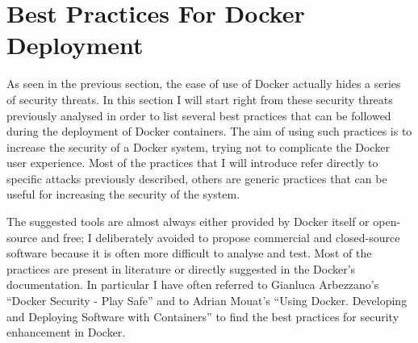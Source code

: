 \documentclass[a4paper,12pt]{article}
\begin{document}




\newpage

\section{Best Practices For Docker Deployment}
\label{sec:best_practices_for_docker_deployment}

As seen in the previous section, the ease of use of Docker actually hides a
series of security threats. In this section I will start right from these
security threats previously analysed in order to list several best practices
that can be followed during the deployment of Docker containers. The aim of
using such practices is to increase the security of a Docker system, trying not
to complicate the Docker user experience. Most of the practices that I will
introduce refer directly to specific attacks previously described, others are
generic practices that can be useful for increasing the security of the system.
\par The suggested tools are almost always either provided by Docker itself or
open-source and free; I deliberately avoided to propose commercial and
closed-source software because it is often more difficult to analyse and
test. Most of the practices are present in literature or directly suggested in
the Docker's documentation. In particular I have often referred to Gianluca
Arbezzano's ``Docker Security - Play Safe'' \cite{arbezzano_play_safe} and to
Adrian Mouat's ``Using Docker. Developing and Deploying Software with
Containers'' \cite{mouat_using_docker} to find the best practices for security
enhancement in Docker. 
\end{document}
